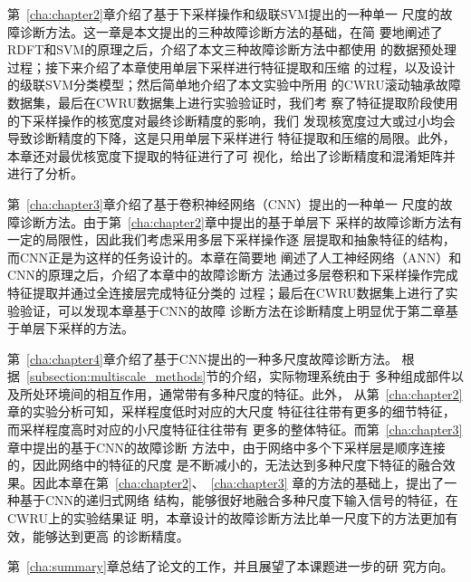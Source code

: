 第~\ref{cha:chapter2}章介绍了基于下采样操作和级联SVM提出的一种单一
尺度的故障诊断方法。这一章是本文提出的三种故障诊断方法的基础，在简
要地阐述了RDFT和SVM的原理之后，介绍了本文三种故障诊断方法中都使用
的数据预处理过程；接下来介绍了本章使用单层下采样进行特征提取和压缩
的过程，以及设计的级联SVM分类模型；然后简单地介绍了本文实验中所用
的CWRU滚动轴承故障数据集，最后在CWRU数据集上进行实验验证时，我们考
察了特征提取阶段使用的下采样操作的核宽度对最终诊断精度的影响，我们
发现核宽度过大或过小均会导致诊断精度的下降，这是只用单层下采样进行
特征提取和压缩的局限。此外，本章还对最优核宽度下提取的特征进行了可
视化，给出了诊断精度和混淆矩阵并进行了分析。

第~\ref{cha:chapter3}章介绍了基于卷积神经网络（CNN）提出的一种单一
尺度的故障诊断方法。由于第~\ref{cha:chapter2}章中提出的基于单层下
采样的故障诊断方法有一定的局限性，因此我们考虑采用多层下采样操作逐
层提取和抽象特征的结构，而CNN正是为这样的任务设计的。本章在简要地
阐述了人工神经网络（ANN）和CNN的原理之后，介绍了本章中的故障诊断方
法通过多层卷积和下采样操作完成特征提取并通过全连接层完成特征分类的
过程；最后在CWRU数据集上进行了实验验证，可以发现本章基于CNN的故障
诊断方法在诊断精度上明显优于第二章基于单层下采样的方法。

第~\ref{cha:chapter4}章介绍了基于CNN提出的一种多尺度故障诊断方法。
根据~\ref{subsection:multiscale_methods}节的介绍，实际物理系统由于
多种组成部件以及所处环境间的相互作用，通常带有多种尺度的特征。此外，
从第~\ref{cha:chapter2}章的实验分析可知，采样程度低时对应的大尺度
特征往往带有更多的细节特征，而采样程度高时对应的小尺度特征往往带有
更多的整体特征。而第~\ref{cha:chapter3}章中提出的基于CNN的故障诊断
方法中，由于网络中多个下采样层是顺序连接的，因此网络中的特征的尺度
是不断减小的，无法达到多种尺度下特征的融合效果。因此本章在第~\ref{cha:chapter2}、~\ref{cha:chapter3}
章的方法的基础上，提出了一种基于CNN的递归式网络
结构，能够很好地融合多种尺度下输入信号的特征，在CWRU上的实验结果证
明，本章设计的故障诊断方法比单一尺度下的方法更加有效，能够达到更高
的诊断精度。

第~\ref{cha:summary}章总结了论文的工作，并且展望了本课题进一步的研
究方向。
